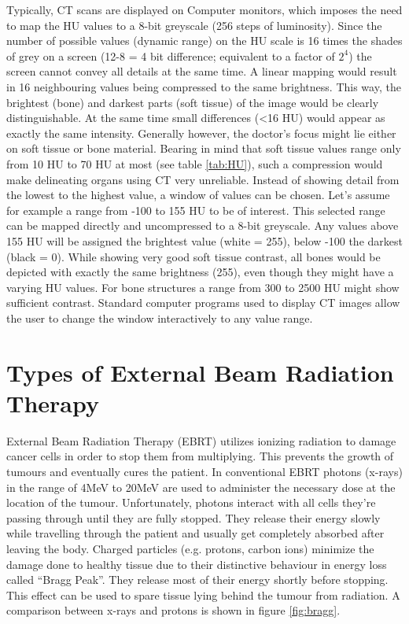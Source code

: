 Typically, CT scans are displayed on Computer monitors, which imposes the need to map the HU values to a 8-bit greyscale (256 steps of luminosity).
Since the number of possible values (dynamic range) on the HU scale is 16 times the shades of grey on a screen (12-8 = 4 bit difference; equivalent to a factor of $2^4$) the screen cannot convey all details at the same time.
A linear mapping would result in 16 neighbouring values being compressed to the same brightness.
This way, the brightest (bone) and darkest parts (soft tissue) of the image would be clearly distinguishable.
At the same time small differences (<16 HU) would appear as exactly the same intensity.
Generally however, the doctor's focus might lie either on soft tissue or bone material.
Bearing in mind that soft tissue values range only from 10 HU to 70 HU at most (see table \ref{tab:HU}), such a compression would make delineating organs using CT very unreliable.
Instead of showing detail from the lowest to the highest value, a window of values can be chosen.
Let's assume for example a range from -100 to 155 HU to be of interest.
This selected range can be mapped directly and uncompressed to a 8-bit greyscale.
Any values above 155 HU will be assigned the brightest value (white = 255), below -100 the darkest (black = 0).
While showing very good soft tissue contrast, all bones would be depicted with exactly the same brightness (255), even though they might have a varying HU values.
For bone structures a range from 300 to 2500 HU might show sufficient contrast.
Standard computer programs used to display CT images allow the user to change the window interactively to any value range.


\section{Types of External Beam Radiation Therapy}
\label{sec:planning}
External Beam Radiation Therapy (EBRT) utilizes ionizing radiation to damage cancer cells in order to stop them from multiplying.
This prevents the growth of tumours and eventually cures the patient. 
In conventional EBRT photons (x-rays) in the range of 4MeV to 20MeV are used to administer the necessary dose at the location of the tumour. Unfortunately, photons interact with all cells
they're passing through until they are fully stopped. They release their energy slowly while travelling through the patient and usually get completely absorbed after leaving the body.
Charged particles (e.g. protons, carbon ions) minimize the damage done to healthy tissue due to their distinctive behaviour in energy loss called ``Bragg Peak''.
They release most of their energy shortly before stopping. \cite{Nakamura2010} This effect can be used to spare tissue lying behind the tumour from radiation. \cite{Paganetti2005} %
A comparison between x-rays and protons is shown in figure \ref{fig:bragg}.

